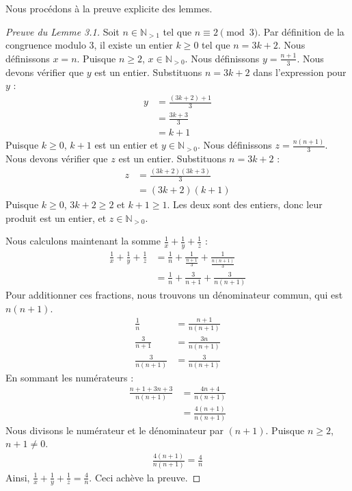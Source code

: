 \documentclass[11pt,a4paper]{article}
\begin{document}
Nous proc\'edons \`a la preuve explicite des lemmes.

\begin{proof}[Preuve du Lemme 3.1]
Soit $n \in \mathbb{N}_{>1}$ tel que $n \equiv 2 \pmod 3$.
Par d\'efinition de la congruence modulo 3, il existe un entier $k \geq 0$ tel que $n = 3k + 2$.
Nous d\'efinissons $x = n$. Puisque $n \geq 2$, $x \in \mathbb{N}_{>0}$.
Nous d\'efinissons $y = \frac{n+1}{3}$.
Nous devons v\'erifier que $y$ est un entier.
Substituons $n = 3k + 2$ dans l'expression pour $y$ :
\begin{align*}
y &= \frac{(3k + 2) + 1}{3} \\
  &= \frac{3k + 3}{3} \\
  &= k + 1
\end{align*}
Puisque $k \geq 0$, $k+1$ est un entier et $y \in \mathbb{N}_{>0}$.
Nous d\'efinissons $z = \frac{n(n+1)}{3}$.
Nous devons v\'erifier que $z$ est un entier.
Substituons $n = 3k + 2$ :
\begin{align*}
z &= \frac{(3k+2)(3k+3)}{3} \\
  &= (3k+2)(k+1)
\end{align*}
Puisque $k \geq 0$, $3k+2 \geq 2$ et $k+1 \geq 1$. Les deux sont des entiers, donc leur produit est un entier, et $z \in \mathbb{N}_{>0}$.

Nous calculons maintenant la somme $\frac{1}{x} + \frac{1}{y} + \frac{1}{z}$ :
\begin{align*}
\frac{1}{x} + \frac{1}{y} + \frac{1}{z} &= \frac{1}{n} + \frac{1}{\frac{n+1}{3}} + \frac{1}{\frac{n(n+1)}{3}} \\
&= \frac{1}{n} + \frac{3}{n+1} + \frac{3}{n(n+1)}
\end{align*}
Pour additionner ces fractions, nous trouvons un d\'enominateur commun, qui est $n(n+1)$.
\begin{align*}
\frac{1}{n} &= \frac{n+1}{n(n+1)} \\
\frac{3}{n+1} &= \frac{3n}{n(n+1)} \\
\frac{3}{n(n+1)} &= \frac{3}{n(n+1)}
\end{align*}
En sommant les num\'erateurs :
\begin{align*}
\frac{n+1 + 3n + 3}{n(n+1)} &= \frac{4n + 4}{n(n+1)} \\
&= \frac{4(n+1)}{n(n+1)}
\end{align*}
Nous divisons le num\'erateur et le d\'enominateur par $(n+1)$. Puisque $n \geq 2$, $n+1 \neq 0$.
\begin{align*}
\frac{4(n+1)}{n(n+1)} = \frac{4}{n}
\end{align*}
Ainsi, $\frac{1}{x} + \frac{1}{y} + \frac{1}{z} = \frac{4}{n}$.
Ceci ach\`eve la preuve.
\end{proof}
\end{document}
